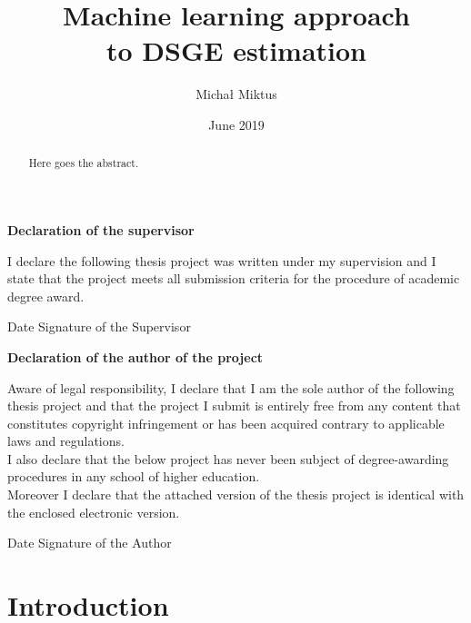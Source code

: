 \documentclass{pracamgr}
\author{Michał Miktus}
\title{Machine learning approach \\
to DSGE estimation}
\date{June 2019}
\numberwithin{equation}{section}
\begin{document}
\maketitle

 \begin{titlepage}
    
    \large
    \null
    \vfill
    
  \textbf{\Large Declaration of the supervisor} 
      \vspace{3mm}
      
   I declare the following thesis project was written under my supervision and I state that the project meets all submission criteria for the procedure of academic degree award.\\
   \vspace{5mm}
   
   Date \hfill Signature of the Supervisor
   
   \vspace{2cm}
   \textbf{\Large Declaration of the author of the project}
    \vspace{3mm}
    
   Aware of legal responsibility, I declare that I am the sole author of the following thesis project and that the project I submit is entirely free from any content that constitutes copyright infringement or has been acquired contrary to applicable laws and regulations.\\
   
   I also declare that the below project has never been subject of degree-awarding procedures in any school of higher education.\\

   Moreover I declare that the attached version of the thesis project is identical with the enclosed electronic version.\\
   \vspace{5mm}
   
   Date  \hfill Signature of the Author 
    \vspace{3cm}
    \end{titlepage}
    
\begin{abstract}
Here goes the abstract. \\
\end{abstract}

\tableofcontents
\listoffigures
\listoftables
\listofalgorithms


\chapter*{Introduction} \label{Introduction}
\end{document}
